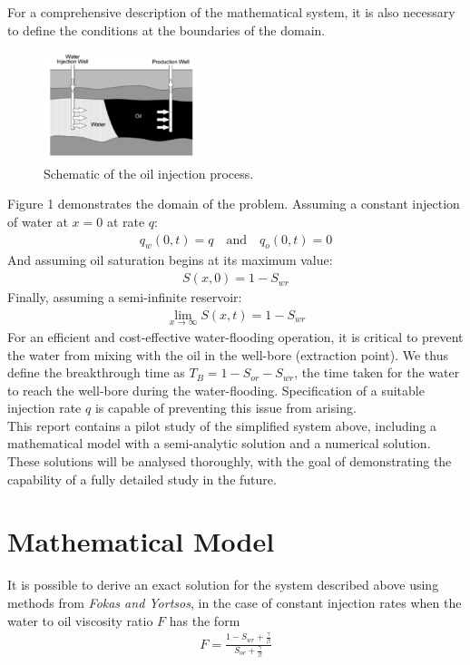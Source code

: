\documentclass[11pt]{article}
\begin{document}
For a comprehensive description of the mathematical system, it is also necessary to define the conditions at the boundaries of the domain.
\begin{figure}[!h]
\centering
\includegraphics[width=0.4\textwidth]{injectionschematic.png}
\caption{Schematic of the oil injection process.}
\end{figure}
Figure 1 demonstrates the domain of the problem. Assuming a constant injection of water at $x=0$ at rate $q$:
\begin{eqnarray}
q_w(0,t) = q\quad\text{and}\quad q_o(0,t) = 0
\end{eqnarray}
And assuming oil saturation begins at its maximum value:
\begin{eqnarray}
S(x,0)=1-S_{wr}
\end{eqnarray}
Finally, assuming a semi-infinite reservoir:
\begin{eqnarray}
\lim_{x\to\infty} S(x,t) = 1-S_{wr}
\end{eqnarray}
For an efficient and cost-effective water-flooding operation, it is critical to prevent the water from mixing with the oil in the well-bore (extraction point). We thus define the breakthrough time as $T_B = 1-S_{or}-S_{wr}$, the time taken for the water to reach the well-bore during the water-flooding. Specification of a suitable injection rate $q$ is capable of preventing this issue from arising.\\

This report contains a pilot study of the simplified system above, including a mathematical model with a semi-analytic solution and a numerical solution. These solutions will be analysed thoroughly, with the goal of demonstrating the capability of a fully detailed study in the future.

\smallbreak
\section{Mathematical Model}
It is possible to derive an exact solution for the system described above using methods from \emph{Fokas and Yortsos}, in the case of constant injection rates when the water to oil viscosity ratio $F$ has the form
\begin{eqnarray}
F=\frac{1-S_{wr}+\frac{\gamma}{\beta}}{S_{or}+\frac{\gamma}{\beta}}
\end{eqnarray}
\end{document}
